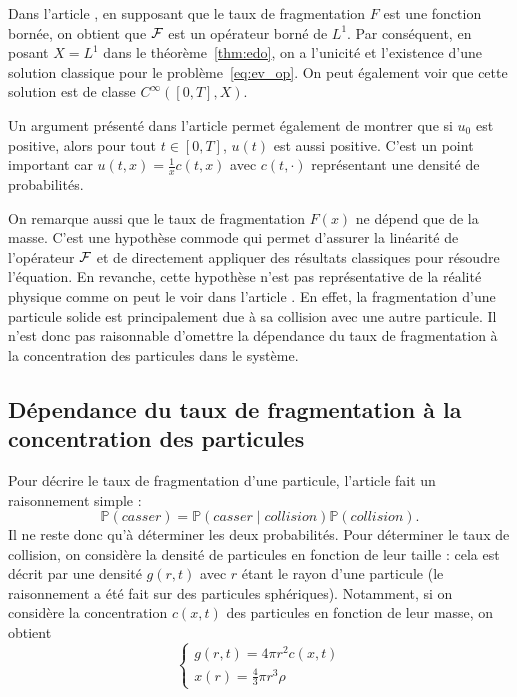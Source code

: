 \begin{rem}
	Dans l'article \cite{frag_deaconu}, en supposant que le taux de fragmentation $F$ est une fonction bornée, on obtient que $\mathcal{F}$ est un opérateur borné de $L^1$. Par conséquent, en posant $X = L^1$ dans le théorème~\ref{thm:edo}, on a l'unicité et l'existence d'une solution classique pour le problème~\ref{eq:ev_op}. On peut également voir que cette solution est de classe $C^\infty([0,T], X)$.
\end{rem}

\begin{rem}
	Un argument présenté dans l'article \cite{frag_deaconu} permet également de montrer que si $u_0$ est positive, alors
	pour tout $t\in [0,T]$, $u(t)$ est aussi positive.
	C'est un point important car $u(t,x) = \frac{1}{x} c(t,x)$ avec $c(t, \cdot)$ représentant une densité de probabilités.
\end{rem}

\begin{rem}
	On remarque aussi que le taux de fragmentation $F(x)$ ne dépend que de la masse. C'est une hypothèse commode qui permet d'assurer la linéarité de l'opérateur
	$\mathcal{F}$ et de directement appliquer des résultats classiques pour résoudre l'équation. En revanche, cette hypothèse n'est pas représentative de la réalité physique comme on peut le voir dans l'article \cite{geo}. En effet, la fragmentation d'une particule solide est principalement due à sa collision avec une autre particule. Il n'est donc pas raisonnable d'omettre la dépendance du taux de fragmentation à la concentration des particules dans le système.
\end{rem}

\subsection{Dépendance du taux de fragmentation à la concentration des particules}

Pour décrire le taux de fragmentation d'une particule, l'article \cite{geo} fait un raisonnement simple :
\[
	\mathbb{P}(casser) = \mathbb{P}(casser \mid collision) \mathbb{P}(collision).
\]
Il ne reste donc qu'à déterminer les deux probabilités. Pour déterminer le taux de collision, on considère la densité de particules en fonction de leur taille : cela est décrit par une densité $g(r,t)$ avec $r$ étant le rayon d'une particule (le raisonnement a été fait sur des particules sphériques). Notamment, si on considère la concentration $c(x,t)$ des particules en fonction de leur masse, on obtient
\begin{equation}
	\begin{cases}
		g(r,t) = 4\pi r^2 c(x,t) \\
		x(r) = \frac{4}{3}\pi r^3 \rho
	\end{cases}
	\label{eq:dens}
\end{equation}

